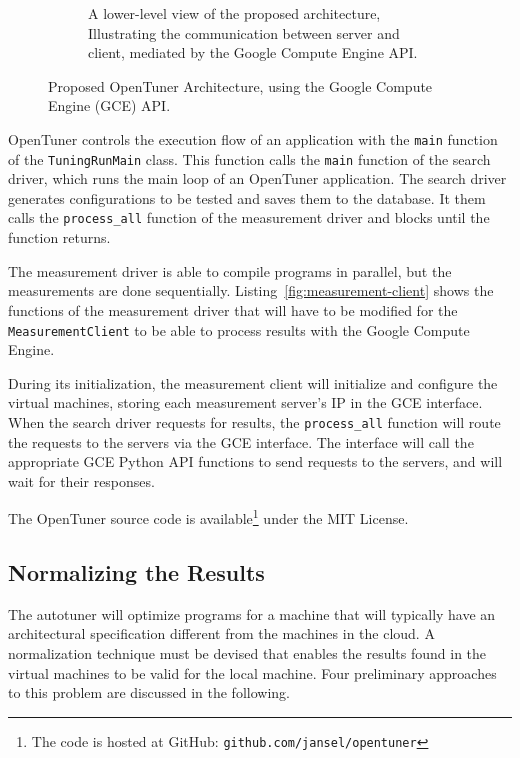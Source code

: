 \documentclass[a4paper, 12pt]{article}
\begin{document}
\begin{figure}[htpb]
\begin{subfigure}{.45\textwidth}
        \caption{A lower-level view of the proposed architecture,
        Illustrating the communication between server and client,
        mediated by the Google Compute Engine API.
        }
        \label{fig:low-level}
    \end{subfigure}%
    \caption{Proposed OpenTuner Architecture,
    using the Google Compute Engine (GCE) API.}
    \label{fig:archs}
\end{figure}

OpenTuner controls the execution flow of an application
with the \texttt{\footnotesize main} function of the
\texttt{\footnotesize TuningRunMain} class. This function
calls the \texttt{\footnotesize main} function of the
search driver, which runs the main loop of an OpenTuner
application. The search driver generates configurations
to be tested and saves them to the database. It them calls
the \texttt{\footnotesize process\_all} function of the
measurement driver and blocks until the function returns.

The measurement driver is able to compile programs in parallel,
but the measurements are done sequentially.
Listing~\ref{fig:measurement-client} shows the functions of
the measurement driver that will have to be modified for the
\texttt{\footnotesize MeasurementClient} to be able to
process results with the Google Compute Engine.

During its initialization, the measurement client will
initialize and configure the virtual machines, storing
each measurement server's IP in the GCE interface.
When the search driver requests for results,
the \texttt{\footnotesize process\_all} function will route
the requests to the servers via the GCE interface.
The interface will call the appropriate GCE Python API
functions to send requests to the servers, and will wait
for their responses.

The OpenTuner source code is
available\footnote{The code is hosted at GitHub:
\texttt{\scriptsize github.com/jansel/opentuner}} under
the MIT License.



\subsection{Normalizing the Results}

The autotuner will optimize programs for a machine that will
typically have an architectural specification different
from the machines in the cloud. A normalization technique
must be devised that enables the results found in the
virtual machines to be valid for the local machine.
Four preliminary approaches to this problem are discussed
in the following.
\end{document}
